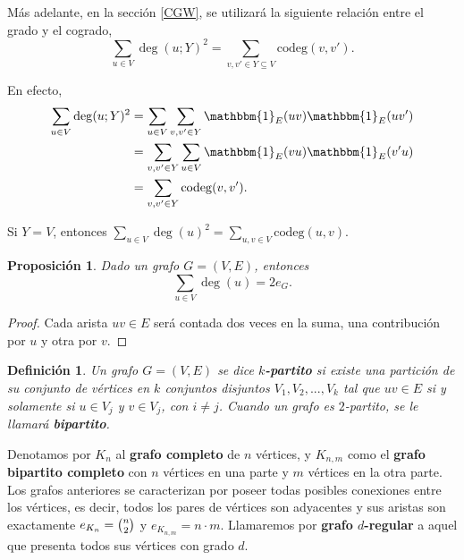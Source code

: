 \documentclass{article}[14pts]
\newtheorem{prop}{Proposición}
\newtheorem{definicion}{Definición}
\newcommand{\cod}{\mathrm{codeg}}
\begin{document}
Más adelante, en la sección \ref{CGW}, se utilizará la siguiente relación entre el grado y el cogrado,
\begin{equation} \label{relación grado-cogrado}
    \sum_{u\in V} \deg(u;Y)^{2} = \sum_{v,v'\in Y\subseteq V} \cod(v,v').
\end{equation} 

En efecto,
\begin{align*}
    \sum_{u\in V} \deg(u;Y)^{2} &= \sum_{u\in V}\sum_{v,v'\in Y} \mathbbm{1}_{E}(uv) \mathbbm{1}_{E}(uv')\\
    &= \sum_{v,v'\in Y}\sum_{u\in V} \mathbbm{1}_{E}(vu) \mathbbm{1}_{E}(v'u)\\
    &= \sum_{v,v'\in Y}\cod(v,v').
\end{align*}

Si $Y = V$, entonces $\sum_{u\in V} \deg(u)^{2} = \sum_{u,v\in V}\cod(u,v)$.

\begin{prop}
    Dado un grafo $G = (V,E)$, entonces
    \begin{equation}
        \sum_{u\in V}\deg (u) = 2e_G.
    \end{equation}
\end{prop}

\begin{proof}
    Cada arista $uv\in E$ será contada dos veces en la suma, una contribución por $u$ y otra por $v$.
\end{proof}\medskip

\begin{definicion}
    Un grafo $G = (V,E)$ se dice \textbf{$k$-partito} si existe una partición de su conjunto de vértices en $k$ conjuntos disjuntos $V_1, V_2, ... ,V_k$ tal que $uv\in E$ si y solamente si $u\in V_j$ y $v\in V_j$, con $i\not=j$. Cuando un grafo es $2$-partito, se le llamará \textbf{bipartito}.
\end{definicion}


Denotamos por $K_n$ al \textbf{grafo completo} de $n$ vértices, y $K_{n,m}$ como el \textbf{grafo bipartito completo} con $n$ vértices en una parte y $m$ vértices en la otra parte. Los grafos anteriores se caracterizan por poseer todas posibles conexiones entre los vértices, es decir, todos los pares de vértices son adyacentes y sus aristas son exactamente $e_{K_n} = \tbinom{n}{2}$ y $e_{K_{n,m}} = n\cdot m$. Llamaremos por \textbf{grafo $d$-regular} a aquel que presenta todos sus vértices con grado $d$. 
\end{document}

